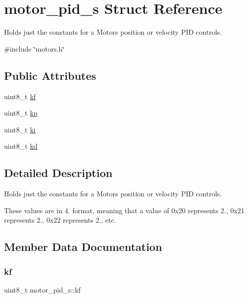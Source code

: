 \hypertarget{structmotor__pid__s}{}\section{motor\+\_\+pid\+\_\+s Struct Reference}
\label{structmotor__pid__s}


Holds just the constants for a Motor\textquotesingle{}s position or velocity P\+ID controls.  




{\ttfamily \#include \char`\"{}motors.\+h\char`\"{}}

\subsection*{Public Attributes}
\begin{DoxyCompactItemize}
\item 
uint8\+\_\+t \hyperlink{structmotor__pid__s_aad53ebe7d1c645811b3dc6cb825bd590}{kf}
\item 
uint8\+\_\+t \hyperlink{structmotor__pid__s_a31c38ff6a4245e81c4db42579b90be31}{kp}
\item 
uint8\+\_\+t \hyperlink{structmotor__pid__s_ac894dd6c3683c2daa403b81e259a1cae}{ki}
\item 
uint8\+\_\+t \hyperlink{structmotor__pid__s_a5241cf4e6e0b3aed6cf9fc52d83769ab}{kd}
\end{DoxyCompactItemize}


\subsection{Detailed Description}
Holds just the constants for a Motor\textquotesingle{}s position or velocity P\+ID controls. 

These values are in 4. format, meaning that a value of 0x20 represents 2., 0x21 represents 2., 0x22 represents 2., etc. 

\subsection{Member Data Documentation}
\mbox{\label{structmotor__pid__s_aad53ebe7d1c645811b3dc6cb825bd590}} 
\subsubsection{\texorpdfstring{kf}{kf}}
{\footnotesize\ttfamily uint8\+\_\+t motor\+\_\+pid\+\_\+s\+::kf}

